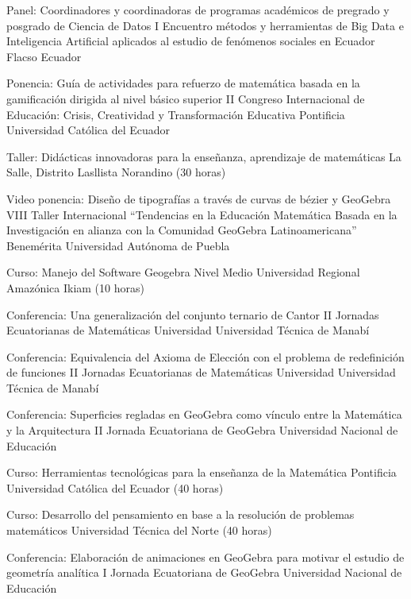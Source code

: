 \documentclass[
	a4paper,
	maincolor=cvblue!70!blue,
	sidecolor=gray!30,
	sectioncolor=cvblue!70!blue,
    sidebarwidth=7.5cm,
	topbottommargin=20pt,
	leftrightmargin=20pt,
]{fortysecondscv}
\begin{document}
    
    {Panel: Coordinadores y coordinadoras de  programas académicos de pregrado y posgrado de Ciencia de Datos}
    {I Encuentro métodos y herramientas de Big Data e Inteligencia Artificial aplicados al estudio de fenómenos sociales en Ecuador}
    {Flacso Ecuador}
    
    {Ponencia: Guía de actividades para refuerzo de matemática basada en la gamificación dirigida al nivel básico superior}
    {II Congreso Internacional de Educación: Crisis, Creatividad y Transformación Educativa}
    {Pontificia Universidad Católica del Ecuador}
    
    {Taller: Didácticas innovadoras para la enseñanza, aprendizaje de matemáticas}
    {}
    {La Salle, Distrito Lasllista Norandino (30 horas)}
    
    {Video ponencia: Diseño de tipografías a través de curvas de bézier y GeoGebra}
    {VIII Taller Internacional “Tendencias en la Educación Matemática Basada en la Investigación en alianza con la Comunidad GeoGebra Latinoamericana”}
    {Benemérita Universidad Autónoma de Puebla}
    

    {Curso: Manejo del Software Geogebra Nivel Medio}
    {}
    {Universidad Regional Amazónica Ikiam (10 horas)}
    
    {Conferencia: Una generalización del conjunto ternario de Cantor}
    {II Jornadas Ecuatorianas de Matemáticas}
    {Universidad Universidad Técnica de Manabí}
    

    {Conferencia: Equivalencia del Axioma de Elección con el problema de redefinición de funciones}
    {II Jornadas Ecuatorianas de Matemáticas}
    {Universidad Universidad Técnica de Manabí}
    
    {Conferencia: Superficies regladas en GeoGebra como vínculo entre la Matemática y la Arquitectura}
    {II Jornada Ecuatoriana de GeoGebra}
    {Universidad Nacional de Educación}
    

    {Curso: Herramientas tecnológicas para la enseñanza de la Matemática}
    {}
    {Pontificia Universidad Católica del Ecuador (40 horas)}
    

    {Curso: Desarrollo del pensamiento en base a la resolución de problemas matemáticos}
    {}
    {Universidad Técnica del Norte (40 horas)}
    
    {Conferencia: Elaboración de animaciones en GeoGebra para motivar el estudio de geometría analítica}
    {I Jornada Ecuatoriana de GeoGebra}
    {Universidad Nacional de Educación}
    
\end{document}
